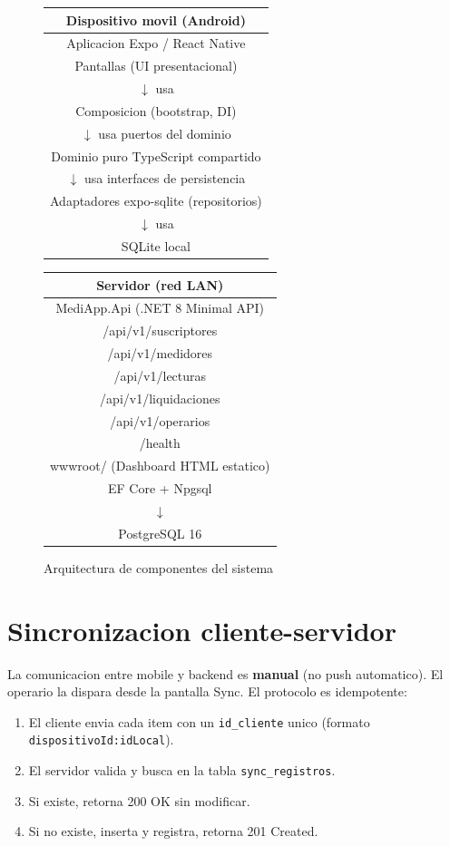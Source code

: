 \documentclass[11pt,a4paper,oneside]{report}
\begin{document}
\begin{figure}[h]
\centering
\begin{tabular}{|c|}
\hline
\textbf{Dispositivo movil (Android)} \\
\hline
Aplicacion Expo / React Native \\
\hline
Pantallas (UI presentacional) \\
$\downarrow$ usa \\
Composicion (bootstrap, DI) \\
$\downarrow$ usa puertos del dominio \\
Dominio puro TypeScript compartido \\
$\downarrow$ usa interfaces de persistencia \\
Adaptadores expo-sqlite (repositorios) \\
$\downarrow$ usa \\
SQLite local \\
\hline
\end{tabular}
\quad
\begin{tabular}{|c|}
\hline
\textbf{Servidor (red LAN)} \\
\hline
MediApp.Api (.NET 8 Minimal API) \\
\hline
/api/v1/suscriptores \\
/api/v1/medidores \\
/api/v1/lecturas \\
/api/v1/liquidaciones \\
/api/v1/operarios \\
/health \\
wwwroot/ (Dashboard HTML estatico) \\
\hline
EF Core + Npgsql \\
$\downarrow$ \\
PostgreSQL 16 \\
\hline
\end{tabular}

\caption{Arquitectura de componentes del sistema}
\end{figure}

\section{Sincronizacion cliente-servidor}

La comunicacion entre mobile y backend es \textbf{manual} (no push automatico). El operario la dispara desde la pantalla Sync. El protocolo es idempotente:

\begin{enumerate}[leftmargin=*]
    \item El cliente envia cada item con un \texttt{id\_cliente} unico (formato \texttt{dispositivoId:idLocal}).
    \item El servidor valida y busca en la tabla \texttt{sync\_registros}.
    \item Si existe, retorna 200 OK sin modificar.
    \item Si no existe, inserta y registra, retorna 201 Created.
\end{enumerate}
\end{document}
